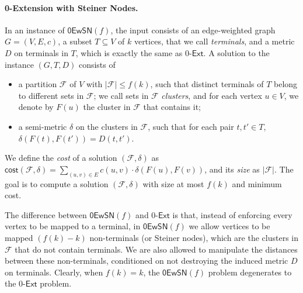 \documentclass[11pt]{article}
\theoremstyle{definition}
\newcommand{\fset}{{\mathcal{F}}}
\newcommand{\dist}{\textnormal{\textsf{dist}}}
\newcommand\vol{\mathsf{cost}}
\newcounter{note}
\newcommand{\zesn}{\mathsf{0EwSN}}
\newcommand{\ze}{$0$-$\textsf{Ext}$\xspace}
\begin{document}
\paragraph{0-Extension with Steiner Nodes.}
In an instance of $\zesn(f)$, the input consists of an edge-weighted graph $G=(V,E,c)$, a subset $T\subseteq V$ of $k$ vertices, that we call \emph{terminals}, and a metric $D$ on terminals in $T$, which is exactly the same as \ze.
A solution to the instance $(G,T,D)$ consists of 
\begin{itemize}
\item a partition $\fset$ of $V$ with $|\fset|\le f(k)$, such that distinct terminals of $T$ belong to different sets in $\fset$; we call sets in $\fset$ \emph{clusters}, and for each vertex $u\in V$, we denote by $F(u)$ the cluster in $\fset$ that contains it;
\item a semi-metric $\delta$ on the clusters in $\fset$, such that for each pair $t,t'\in T$, $\delta(F(t),F(t'))= D(t,t')$.
\end{itemize}
%
We define the \emph{cost} of a solution $(\fset,\delta)$ as $\vol(\fset,\delta)=\sum_{(u,v)\in E}c(u,v)\cdot\delta(F(u),F(v))$, and its \emph{size} as $|\fset|$.
The goal is to compute a solution $(\fset,\delta)$ with size at most $f(k)$ and minimum cost. 

The difference between $\zesn(f)$ and \ze is that, instead of enforcing every vertex to be mapped to a terminal, in $\zesn(f)$ we allow vertices to be mapped $(f(k)-k)$ non-terminals (or Steiner nodes), which are the clusters in $\fset$ that do not contain terminals. 
We are also allowed to manipulate the distances between these non-terminals, conditioned on not destroying the induced metric $D$ on terminals. Clearly, when $f(k)=k$, the $\zesn(f)$ problem degenerates to the \ze problem.

\end{document}
